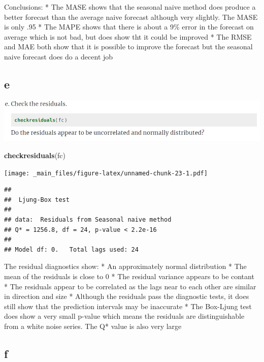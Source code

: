 \documentclass[]{book}
\newenvironment{Shaded}{\begin{snugshade}}{\end{snugshade}}
\newcommand{\KeywordTok}[1]{\textcolor[rgb]{0.13,0.29,0.53}{\textbf{#1}}}
\newcommand{\NormalTok}[1]{#1}
\begin{document}
Conclusions:
* The MASE shows that the seasonal naive method does produce a better forecast than the average naive forecast although very slightly. The MASE is only .95
* The MAPE shows that there is about a 9\% error in the forecast on average which is not bad, but does show tht it could be improved
* The RMSE and MAE both show that it is possible to improve the forecast but the seasonal naive forecast does do a decent job

\hypertarget{e}{%
\subsection{e}\label{e}}

\includegraphics{./week1/3.8e.png}

\begin{Shaded}
\begin{Highlighting}[]
\KeywordTok{checkresiduals}\NormalTok{(fc)}
\end{Highlighting}
\end{Shaded}

\texttt{[image: \_main\_files/figure-latex/unnamed-chunk-23-1.pdf]}

\begin{verbatim}
## 
##  Ljung-Box test
## 
## data:  Residuals from Seasonal naive method
## Q* = 1256.8, df = 24, p-value < 2.2e-16
## 
## Model df: 0.   Total lags used: 24
\end{verbatim}

The residual diagnostics show:
* An approximately normal distribution
* The mean of the residuals is close to 0
* The residual variance appears to be contant
* The residuals appear to be correlated as the lags near to each other are similar in direction and size
* Although the residuals pass the diagnostic tests, it does still show that the prediction intervals may be inaccurate
* The Box-Ljung test does show a very small p-value which means the residuals are distinguishable from a white noise series. The Q* value is also very large

\hypertarget{f}{%
\subsection{f}\label{f}}
\end{document}
